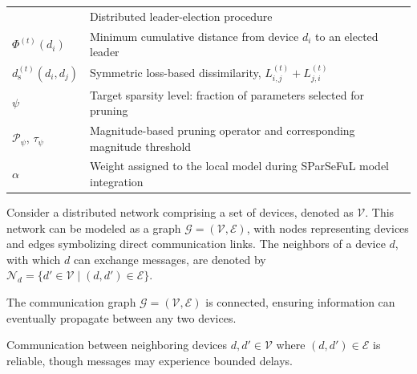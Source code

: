 \begin{table}
\begin{tabular}{@{}p{}p{}@{}}
      & Distributed leader-election procedure \\
    $\Phi^{(t)}(d_i)$
      & Minimum cumulative distance from device $d_i$ to an elected leader \\
    $d_{\mathrm{s}}^{(t)}(d_i,d_j)$
      & Symmetric loss-based dissimilarity, $L_{i,j}^{(t)}+L_{j,i}^{(t)}$ \\
    $\psi$
      & Target sparsity level: fraction of parameters selected for pruning \\
    $\mathcal{P}_{\psi}$, $\tau_{\psi}$
      & Magnitude-based pruning operator and corresponding magnitude threshold \\
    $\alpha$
      & Weight assigned to the local model during SParSeFuL model integration \\
    \bottomrule
  \end{tabular}
\end{table}


Consider a distributed network comprising a set of devices, 
 denoted as $\mathcal{V}$.
%
This network can be modeled as a graph $\mathcal{G} = (\mathcal{V}, \mathcal{E})$,
 with nodes representing devices and edges symbolizing direct communication links. 
%
The neighbors of a device $d$, with which $d$ can exchange messages, 
 are denoted by $\mathcal{N}_d = \{d' \in \mathcal{V} \mid (d, d') \in \mathcal{E}\}$.

\begin{assumption}\label{assumption:network-connectivity}
The communication graph $\mathcal{G} = (\mathcal{V}, \mathcal{E})$ is connected, 
 ensuring information can eventually propagate between any two devices.
\end{assumption}
%
\begin{assumption}\label{assumption:reliable-message-delivery}
Communication between neighboring devices $d, d' \in \mathcal{V}$ where $(d, d') \in \mathcal{E}$ is reliable, 
 though messages may experience bounded delays.
\end{assumption}


